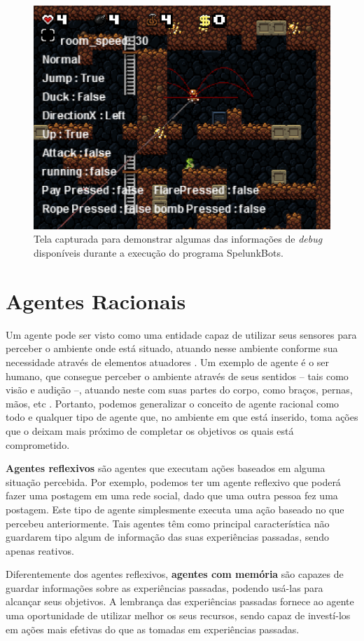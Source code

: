 \begin{figure}[htb!]
\centering\includegraphics[width=.65\textwidth]{fig/spelunkbots-debug-screen.png}
\caption {\label{fig:spelunkbots-debug-screen}Tela capturada para demonstrar
algumas das informações de \textit{debug} disponíveis durante a execução do
programa SpelunkBots.} \end{figure}


\section{\label{section:agents}Agentes Racionais}
Um agente pode ser visto como uma entidade capaz de utilizar seus sensores para
perceber o ambiente onde está situado, atuando nesse ambiente conforme sua
necessidade através de elementos atuadores \cite{Russell:1995:AIM:193191}.
Um exemplo de agente é o ser humano, que consegue perceber o ambiente através
de seus sentidos -- tais como visão e audição --, atuando neste com suas partes
do corpo, como braços, pernas, mãos, etc \cite{Russell:1995:AIM:193191}.
Portanto, podemos generalizar o conceito de agente racional como todo e
qualquer tipo de agente que, no ambiente em que está inserido, toma ações que o
deixam mais próximo de completar os objetivos os quais está comprometido.

\textbf{Agentes reflexivos} são agentes que executam ações baseados em alguma
situação percebida. Por exemplo, podemos ter um agente reflexivo que poderá
fazer uma postagem em uma rede social, dado que uma outra pessoa fez uma
postagem. Este tipo de agente simplesmente executa uma ação baseado no que
percebeu anteriormente. Tais agentes têm como principal característica não
guardarem tipo algum de informação das suas experiências passadas, sendo apenas
reativos.

Diferentemente dos agentes reflexivos, \textbf{agentes com memória} são capazes
de guardar informações sobre as experiências passadas, podendo usá-las para
alcançar seus objetivos. A lembrança das experiências passadas fornece ao
agente uma oportunidade de utilizar melhor os seus recursos, sendo capaz de
investí-los em ações mais efetivas do que as tomadas em experiências passadas.

